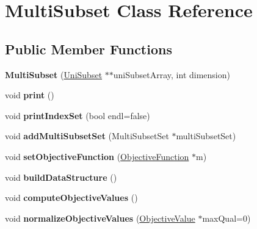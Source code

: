\hypertarget{classMultiSubset}{\section{Multi\-Subset Class Reference}
\label{classMultiSubset}
}
\subsection*{Public Member Functions}
\begin{DoxyCompactItemize}
\item 
\hypertarget{classMultiSubset_a25dd2f5b4c0ab03af23631da5fc648a5}{{\bfseries Multi\-Subset} (\hyperlink{classUniSubset}{Uni\-Subset} $\ast$$\ast$uni\-Subset\-Array, int dimension)}\label{classMultiSubset_a25dd2f5b4c0ab03af23631da5fc648a5}

\item 
\hypertarget{classMultiSubset_ad614a02a6bf87b55090528fdaeb0d38b}{void {\bfseries print} ()}\label{classMultiSubset_ad614a02a6bf87b55090528fdaeb0d38b}

\item 
\hypertarget{classMultiSubset_aa97335371d1a426c70b18b6b1d20d081}{void {\bfseries print\-Index\-Set} (bool endl=false)}\label{classMultiSubset_aa97335371d1a426c70b18b6b1d20d081}

\item 
\hypertarget{classMultiSubset_ab003489c7d1b2fab72d0f06eec46591c}{void {\bfseries add\-Multi\-Subset\-Set} (Multi\-Subset\-Set $\ast$multi\-Subset\-Set)}\label{classMultiSubset_ab003489c7d1b2fab72d0f06eec46591c}

\item 
\hypertarget{classMultiSubset_af7260e6eed96845f5a8afcb2ef944279}{void {\bfseries set\-Objective\-Function} (\hyperlink{classObjectiveFunction}{Objective\-Function} $\ast$m)}\label{classMultiSubset_af7260e6eed96845f5a8afcb2ef944279}

\item 
\hypertarget{classMultiSubset_abb1e5060527541e62d2d932efd51e180}{void {\bfseries build\-Data\-Structure} ()}\label{classMultiSubset_abb1e5060527541e62d2d932efd51e180}

\item 
\hypertarget{classMultiSubset_a1d5cde39c8f6fc9eed7f40588a6510f9}{void {\bfseries compute\-Objective\-Values} ()}\label{classMultiSubset_a1d5cde39c8f6fc9eed7f40588a6510f9}

\item 
\hypertarget{classMultiSubset_ac2b605fa4cd2fdea187d029429afda3b}{void {\bfseries normalize\-Objective\-Values} (\hyperlink{classObjectiveValue}{Objective\-Value} $\ast$max\-Qual=0)}\label{classMultiSubset_ac2b605fa4cd2fdea187d029429afda3b}


\end{DoxyCompactItemize}
